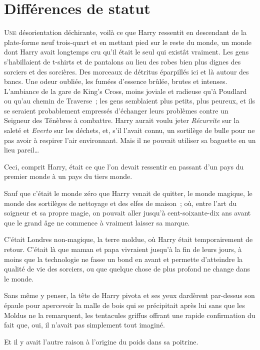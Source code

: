 \chapter{Différences de statut}

\lettrine{U}{ne} désorientation déchirante, voilà ce que Harry ressentit en descendant de la plate-forme neuf trois-quart et en mettant pied sur le reste du monde, un monde dont Harry avait longtemps cru qu'il était le seul qui existât vraiment. Les gens s'habillaient de t-shirts et de pantalons au lieu des robes bien plus dignes des sorciers et des sorcières. Des morceaux de détritus éparpillés ici et là autour des bancs. Une odeur oubliée, les fumées d'essence brûlée, brutes et intenses. L'ambiance de la gare de King's Cross, moins joviale et radieuse qu'à Poudlard ou qu'au chemin de Traverse~; les gens semblaient plus petits, plus peureux, et ils se seraient probablement empressés d'échanger leurs problèmes contre un Seigneur des Ténèbres à combattre. Harry aurait voulu jeter \emph{Récurvite} sur la saleté et \emph{Everto} sur les déchets, et, s'il l'avait connu, un sortilège de bulle pour ne pas avoir à respirer l'air environnant. Mais il ne pouvait utiliser sa baguette en un lieu pareil…

Ceci, comprit Harry, était ce que l'on devait ressentir en passant d'un pays du premier monde à un pays du tiers monde.

Sauf que c'était le monde zéro que Harry venait de quitter, le monde magique, le monde des sortilèges de nettoyage et des elfes de maison~; où, entre l'art du soigneur et sa propre magie, on pouvait aller jusqu'à cent-soixante-dix ans avant que le grand âge ne commence à vraiment laisser sa marque.

C'était Londres non-magique, la terre moldue, où Harry était temporairement de retour. C'était là que maman et papa vivraient jusqu'à la fin de leurs jours, à moins que la technologie ne fasse un bond en avant et permette d'atteindre la qualité de vie des sorciers, ou que quelque chose de plus profond ne change dans le monde.

Sans même y penser, la tête de Harry pivota et ses yeux dardèrent par-dessus son épaule pour apercevoir la malle de bois qui se précipitait après lui sans que les Moldus ne la remarquent, les tentacules griffus offrant une rapide confirmation du fait que, oui, il n'avait pas simplement tout imaginé.

Et il y avait l'autre raison à l'origine du poids dans sa poitrine.

